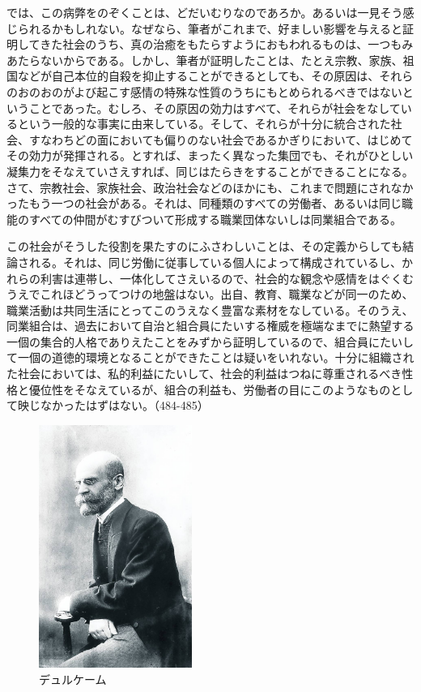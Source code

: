では、この病弊をのぞくことは、どだいむりなのであろか。あるいは一見そう感じられるかもしれない。なぜなら、筆者がこれまで、好ましい影響を与えると証明してきた社会のうち、真の治癒をもたらすようにおもわれるものは、一つもみあたらないからである。しかし、筆者が証明したことは、たとえ宗教、家族、祖国などが自己本位的自殺を抑止することができるとしても、その原因は、それらのおのおのがよび起こす感情の特殊な性質のうちにもとめられるべきではないということであった。むしろ、その原因の効力はすべて、それらが社会をなしているという一般的な事実に由来している。そして、それらが十分に統合された社会、すなわちどの面においても偏りのない社会であるかぎりにおいて、はじめてその効力が発揮される。とすれば、まったく異なった集団でも、それがひとしい凝集力をそなえていさえすれば、同じはたらきをすることができることになる。さて、宗教社会、家族社会、政治社会などのほかにも、これまで問題にされなかったもう一つの社会がある。それは、同種類のすべての労働者、あるいは同じ職能のすべての仲間がむすびついて形成する職業団体ないしは同業組合である。

この社会がそうした役割を果たすのにふさわしいことは、その定義からしても結論される。それは、同じ労働に従事している個人によって構成されているし、かれらの利害は連帯し、一体化してさえいるので、社会的な観念や感情をはぐくむうえでこれほどうってつけの地盤はない。出自、教育、職業などが同一のため、職業活動は共同生活にとってこのうえなく豊富な素材をなしている。そのうえ、同業組合は、過去において自治と組合員にたいする権威を極端なまでに熱望する一個の集合的人格でありえたことをみずから証明しているので、組合員にたいして一個の道徳的環境となることができたことは疑いをいれない。十分に組織された社会においては、私的利益にたいして、社会的利益はつねに尊重されるべき性格と優位性をそなえているが、組合の利益も、労働者の目にこのようなものとして映じなかったはずはない。（484-485）



 \begin{figure}[htbp]
   \centering
   \includegraphics[width=50mm]{images/durkheim.jpg}
   \caption{デュルケーム}
 \end{figure}


